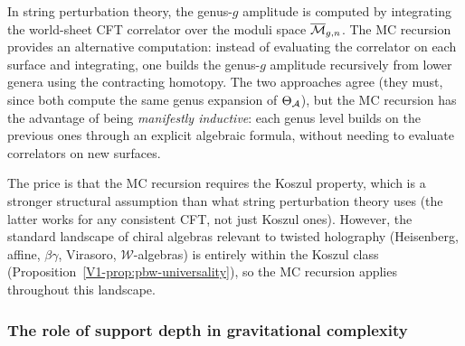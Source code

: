 \begin{remark}
In string perturbation theory, the genus-$g$ amplitude is
computed by integrating the world-sheet CFT correlator over
the moduli space $\overline{\mathcal{M}}_{g,n}$. The MC recursion
provides an alternative computation: instead of evaluating the
correlator on each surface and integrating, one builds the
genus-$g$ amplitude recursively from lower genera using the
contracting homotopy. The two approaches agree (they must,
since both compute the same genus expansion of $\Theta_{\mathcal{A}}$),
but the MC recursion has the advantage of being
\emph{manifestly inductive}: each genus level builds on the
previous ones through an explicit algebraic formula, without
needing to evaluate correlators on new surfaces.

The price is that the MC recursion requires the Koszul
property, which is a stronger structural assumption than what
string perturbation theory uses (the latter works for any
consistent CFT, not just Koszul ones). However, the standard
landscape of chiral algebras relevant to twisted holography
(Heisenberg, affine, $\beta\gamma$, Virasoro, $\mathcal{W}$-algebras)
is entirely within the Koszul class
(Proposition~\ref{V1-prop:pbw-universality}), so the MC recursion
applies throughout this landscape.
\end{remark}

\subsubsection{The role of support depth in gravitational
complexity}

